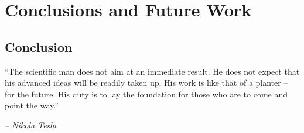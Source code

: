 \chapter{Conclusions and Future Work}\label{ch:chapter10}
\section{Conclusion}

\epigraph{``The scientific man does not aim at an immediate result. He does not expect that his advanced ideas will be readily taken up. His work is like that of a planter -- for the future. His duty is to lay the foundation for those who are to come and point the way.''}{\textit{-- Nikola Tesla}}

	\lipsum[1]
	
	\lipsum[1]
